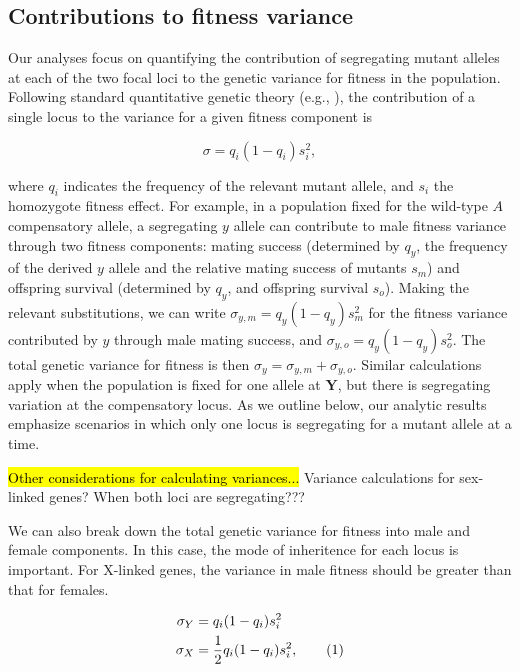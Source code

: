 \documentclass{article}
\newcommand\numberthis{\addtocounter{equation}{1}\tag{\theequation}}
\begin{document}
\subsection{Contributions to fitness variance} \label{subsec:variances}

Our analyses focus on quantifying the contribution of segregating mutant alleles at each of the two focal loci to the genetic variance for fitness in the population. Following standard quantitative genetic theory (e.g., \citealt{James1973,LynchWalsh1998}), the contribution of a single locus to the variance for a given fitness component is 

\begin{equation} \label{eq:fitnessVariance}
	\sigma = q_{i}(1 - q_{i})s_{i}^{2},
\end{equation}

\noindent where $q_i$ indicates the frequency of the relevant mutant allele, and $s_i$ the homozygote fitness effect. For example, in a population fixed for the wild-type $A$ compensatory allele, a segregating $y$ allele can contribute to male fitness variance through two fitness components: mating success (determined by $q_y$, the frequency of the derived $y$ allele and the relative mating success of mutants $s_m$) and offspring survival (determined by $q_y$, and offspring survival $s_o$). Making the relevant substitutions, we can write $\sigma_{y,m} = q_{y}(1 - q_{y})s_{m}^{2}$ for the fitness variance contributed by $y$ through male mating success, and $\sigma_{y,o} = q_{y}(1 - q_{y})s_{o}^{2}$. The total genetic variance for fitness is then $\sigma_{y} = \sigma_{y,m} + \sigma_{y,o}$. Similar calculations apply when the population is fixed for one allele at $\mathbf{Y}$, but there is segregating variation at the compensatory locus. As we outline below, our analytic results emphasize scenarios in which only one locus is segregating for a mutant allele at a time.

\hl{Other considerations for calculating variances...} Variance calculations for sex-linked genes? When both loci are segregating??? 

We can also break down the total genetic variance for fitness into male and female components. In this case, the mode of inheritence for each locus is important. For X-linked genes, the variance in male fitness should be greater than that for females.

\begin{linenomath}\begin{align*} \label{eq:abc}
	\sigma_{Y} &= q_{i}(1 - q_{i})s_{i}^{2} \\
	\sigma_{X} &	= \frac{1}{2}q_{i}(1 - q_{i})s_{i}^{2}, \numberthis
\end{align*}\end{linenomath}
\end{document}
